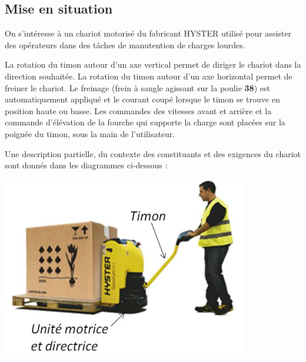 \documentclass[10pt]{article}
\begin{document}

 \renewcommand{\baselinestretch}{1.2}
\setlength{\parskip}{0ex plus 0.5ex minus 0.2ex}


\subsection*{Mise en situation}


\begin{minipage}[c]{.7\linewidth}
On s’intéresse à un chariot motorisé du fabricant HYSTER utilisé pour assister des opérateurs dans des tâches de manutention de charges lourdes. 

La rotation du timon autour d’un axe vertical permet de diriger le chariot dans la direction souhaitée. La rotation du timon autour d’un axe horizontal permet de freiner le chariot. Le freinage (frein à sangle agissant sur la poulie \textbf{38}) est automatiquement appliqué et le courant coupé lorsque le timon se trouve en position haute ou basse.
Les commandes des vitesses avant et arrière et la commande d’élévation de la fourche qui supporte la charge sont placées sur la poignée du timon, sous la main de l’utilisateur. 

Une description partielle, du contexte des constituants et des exigences du chariot sont donnés dans les diagrammes ci-dessous :
\end{minipage} \hfill
\begin{minipage}[c]{.27\linewidth}
\begin{center}
\includegraphics[width=\textwidth]{images/fig1}
\end{center}
\end{minipage}
\end{document}
